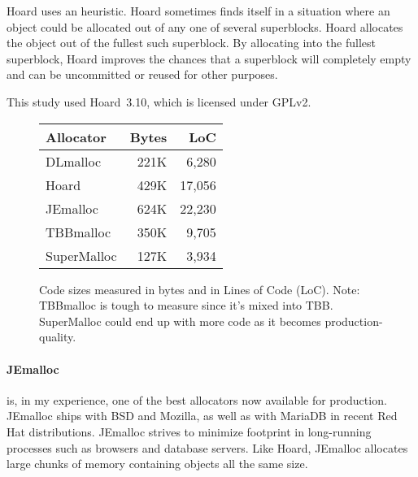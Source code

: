 \documentclass[natbib,sort&compress,10pt]{sigplanconf}
\begin{document}
Hoard uses an  heuristic.  Hoard sometimes
finds itself in a situation where an object could be allocated out of
any one of several superblocks.  Hoard allocates the object out of the
fullest such superblock. By allocating into the fullest superblock,
Hoard improves the chances that a superblock will completely empty and
can be uncommitted or reused for other purposes.

This study used Hoard~3.10, which is licensed under GPLv2.

\begin{figure}
\begin{center}
\begin{tabular}{lrr}
Allocator & Bytes        & LoC \\ \hline
 DLmalloc    \cite{Lea96}        & 221K &  6,280 \\
 Hoard       \cite{BergerMcBl00} & 429K & 17,056 \\
 JEmalloc    \cite{Evans06}      & 624K & 22,230 \\
 TBBmalloc   \cite{KukanovVo07}  & 350K &  9,705 \\
 SuperMalloc                     & 127K &  3,934 \\
\end{tabular}
\end{center}
\caption{Code sizes measured in bytes and in Lines of Code (LoC).
  Note: TBBmalloc is tough to measure since it's mixed into TBB.
  SuperMalloc could end up with more code as it becomes
  production-quality.}
\label{fig:codesize}
\end{figure}

{\paragraph{JEmalloc}} \cite{Evans06} is, in my experience, one of the
best allocators now available for production.  JEmalloc ships with BSD
and Mozilla, as well as with MariaDB in recent Red Hat distributions.
JEmalloc strives to minimize footprint in long-running processes such
as browsers and database servers.  Like Hoard, JEmalloc allocates
large chunks of memory containing objects all the same size.
\end{document}
